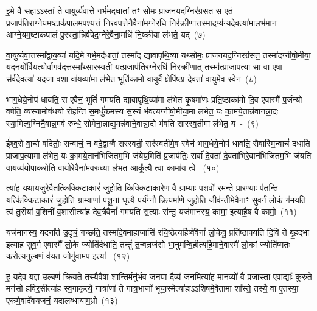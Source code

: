 {\anuvakamend[{सर॑स्वत्यै॒ स्वाहा॒ मनु॒स्त्रयो॑दश च}]}

इ॒मे वै स॒हा\-ऽऽ\-स्तां॒ ते वा॒युर्व्य॑वा॒त्ते गर्भ॑मदधातां॒ तꣳ सोमः॒ प्राज॑नयद॒ग्निर॑ग्रसत॒ स ए॒तं प्र॒जा\-प॑तिराग्ने॒यम॒ष्टाक॑पाल\-मपश्य॒त्तं निर॑\-वप॒त्तेनै॒वैना॑म॒ग्नेरधि॒ निर॑क्रीणा॒त्तस्मा॒दप्य॑न्य\-देव॒त्या॑\-मा॒लभ॑मान आ\-ग्ने॒य\-म॒ष्टाक॑पालं पु॒रस्ता॒न्निर्व॑पेद॒ग्ने\-रे॒वैना॒मधि॑ नि॒ष्क्रीया ल॑भते॒ यद्~(७)\ip

वा॒युर्व्यवा॒त्तस्मा᳚द्\-वाय॒व्या॑ यदि॒मे गर्भ॒मद॑धातां॒ तस्मा᳚द् द्यावा\-पृथि॒व्या॑ यथ्सोमः॒ प्राज॑नयद॒ग्निरग्र॑सत॒ तस्मा॑दग्नीषो॒मीया॒ यद॒नयो᳚र्विय॒त्योर्वागव॑द॒त्तस्मा᳚थ्सारस्व॒ती यत्प्र॒जा\-प॑तिर॒ग्नेरधि॑ नि॒र\-क्री॑णा॒त् तस्मा᳚त्प्राजाप॒त्या सा वा ए॒षा स॑र्वदेव॒त्या॑ यद॒जा व॒शा वा॑य॒व्या॑मा ल॑भेत॒ भूति॑कामो वा॒युर्वै क्षेपि॑ष्ठा दे॒वता॑ वा॒युमे॒व स्वेन॑~(८)\ip

भाग॒\-धेये॒नोप॑ धावति॒ स ए॒वैनं॒ भूतिं॑ गमयति द्यावा\-पृथि॒व्या॑मा ल॑भेत कृ॒षमा॑णः प्रति॒ष्ठाका॑मो दि॒व ए॒वास्मै॑ प॒र्जन्यो॑ वर्\mbox{}षति॒ व्य॑स्यामोष॑धयो रोहन्ति स॒मर्धु॑कमस्य स॒स्यं भ॑वत्यग्नीषो॒मीया॒मा ल॑भेत॒ यः का॒मये॒तान्न॑वानन्ना॒दः स्या॒मित्य॒ग्निनै॒वान्न॒मव॑ रुन्धे॒ सोमे॑ना॒न्नाद्य॒मन्न॑वाने॒वान्ना॒दो भ॑वति सारस्व॒तीमा ल॑भेत॒ य~-~(९)\ip

ई᳚श्व॒रो वा॒चो वदि॑तोः॒ सन्वाचं॒ न वदे॒द्वाग्वै सर॑स्वती॒ सर॑स्वतीमे॒व स्वेन॑ भाग॒\-धेये॒नोप॑ धावति॒ सैवास्मि॒न्वाचं॑ दधाति प्राजाप॒त्यामा ल॑भेत॒ यः का॒मये॒तान॑भिजितम॒भि ज॑येय॒मिति॑ प्र॒जा\-प॑तिः॒ सर्वा॑ दे॒वता॑ दे॒वता॑भिरे॒वान॑भि\-जितम॒भि ज॑यति वाय॒व्य॑यो॒पा\-क॑रोति वा॒योरे॒वैना॑मव॒रुध्या ल॑भत॒ आकू᳚त्यै त्वा॒ कामा॑य॒ त्वे-~(१०)\ip

त्या॑ह यथाय॒जुरे॒वैतत्कि॑क्किटा॒कारं॑ जुहोति किक्किटाका॒रेण॒ वै ग्रा॒म्याः प॒शवो॑ रमन्ते॒ प्रार॒ण्याः प॑तन्ति॒ यत्कि॑क्किटा॒कारं॑ जु॒होति॑ ग्रा॒म्याणां᳚ पशू॒नां धृत्यै॒ पर्य॑ग्नौ क्रि॒यमा॑णे जुहोति॒ जीव॑न्तीमे॒वैनाꣳ॑ सुव॒र्गं लो॒कं ग॑मयति॒ त्वं तु॒रीया॑ व॒शिनी॑ व॒शासीत्या॑ह देव॒त्रैवैनां᳚ गमयति स॒त्याः स॑न्तु॒ यज॑मानस्य॒ कामा॒ इत्या॑है॒ष वै कामो॒~(११)\ip

यज॑मानस्य॒ यदना᳚र्त उ॒दृचं॒ गच्छ॑ति॒ तस्मा॑दे॒वमा॑हा॒जासि॑ रयि॒ष्ठेत्या॑है॒ष्वे॑वैनां᳚ लो॒केषु॒ प्रति॑\-ष्ठापयति दि॒वि ते॑ बृ॒हद्भा इत्या॑ह सुव॒र्ग ए॒वास्मै॑ लो॒के ज्योति॑र्दधाति॒ तन्तुं॑ त॒न्वन्रज॑सो भा॒नुमन्वि॒ही\-त्या॑\-हे॒माने॒वास्मै॑ लो॒कां ज्योति॑ष्मतः करोत्यनुल्ब॒णं व॑यत॒ जोगु॑वा॒मप॒ इत्या॑-~(१२)\ip

ह॒ यदे॒व य॒ज्ञ उ॒ल्बणं॑ क्रि॒यते॒ तस्यै॒वैषा शान्ति॒र्मनु॑र्भव ज॒नया॒ दैव्यं॒ जन॒मित्या॑ह मान॒व्यो॑ वै प्र॒जास्ता ए॒वाद्याः᳚ कुरुते॒ मन॑सो ह॒विर॒सीत्या॑ह स्व॒गाकृ॑त्यै॒ गात्रा॑णां ते गात्र॒भाजो॑ भूया॒स्मेत्या॑हा॒\-ऽऽ\-\-शिष॑मे॒वैतामा शा᳚स्ते॒ तस्यै॒ वा ए॒तस्या॒ एक॑मे॒वादे॑वयजनं॒ यदाल॑ब्धायाम॒भ्रो~(१३)\ip


